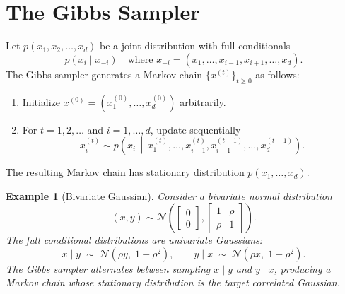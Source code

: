 \documentclass[11pt, twoside]{report}
\newtheorem{example}[theorem]{Example}
\begin{document}

\section{The Gibbs Sampler}
Let $p(x_1, x_2, \dots, x_d)$ be a joint distribution with full conditionals
\[
p(x_i \mid x_{-i}) \quad \text{where } x_{-i} = (x_1, \dots, x_{i-1}, x_{i+1}, \dots, x_d).
\]
The Gibbs sampler generates a Markov chain $\{x^{(t)}\}_{t \geq 0}$ as follows:
\begin{enumerate}
    \item Initialize $x^{(0)} = (x_1^{(0)}, \dots, x_d^{(0)})$ arbitrarily.
    \item For $t = 1,2,\dots$ and $i = 1,\dots,d$, update sequentially
    \[
    x_i^{(t)} \sim p\!\left(x_i \,\middle|\, x_1^{(t)}, \dots, x_{i-1}^{(t)}, x_{i+1}^{(t-1)}, \dots, x_d^{(t-1)}\right).
    \]
\end{enumerate}
The resulting Markov chain has stationary distribution $p(x_1, \dots, x_d)$.
\begin{example}[Bivariate Gaussian]
Consider a bivariate normal distribution
\[
(x,y) \sim \mathcal{N}\!\left(
\begin{bmatrix} 0 \\ 0 \end{bmatrix},
\begin{bmatrix} 1 & \rho \\ \rho & 1 \end{bmatrix}
\right).
\]
The full conditional distributions are univariate Gaussians:
\[
x \mid y \;\sim\; \mathcal{N}(\rho y,\; 1 - \rho^2), 
\quad\quad
y \mid x \;\sim\; \mathcal{N}(\rho x,\; 1 - \rho^2).
\]
The Gibbs sampler alternates between sampling $x \mid y$ and $y \mid x$, producing a Markov chain whose stationary distribution is the target correlated Gaussian.
\end{example}
\end{document}
